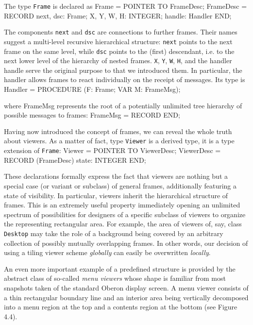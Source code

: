 The type {\tt Frame\/} is declared as
\begintt
Frame = POINTER TO FrameDesc;
FrameDesc = RECORD
  next, dsc: Frame;
  X, Y, W, H: INTEGER;
  handle: Handler
END;
\endtt

\noindent The components {\tt next\/} and {\tt dsc\/} are connections to further frames. Their
names suggest a multi-level recursive hierarchical structure: {\tt next\/}
points to the next frame on the same level, while {\tt dsc\/} points to the
(first) descendant, i.e. to the next lower level of the hierarchy of
nested frames. {\tt X\/}, {\tt Y\/}, {\tt W\/}, {\tt H\/}, and the handler handle serve the original
purpose to that we introduced them. In particular, the handler allows
frames to react individually on the receipt of messages. Its type is
\begintt
Handler = PROCEDURE (F: Frame; VAR M: FrameMsg);
\endtt

\noindent where FrameMsg represents the root of a potentially unlimited tree hierarchy of possible messages to frames:
\begintt
FrameMsg = RECORD END;
\endtt

\noindent Having now introduced the concept of frames, we can reveal the whole truth about viewers. As a matter of fact, type {\tt Viewer\/} is a derived type, it is a type extension of {\tt Frame\/}:
\begintt
Viewer = POINTER TO ViewerDesc;
ViewerDesc = RECORD (FrameDesc)
  state: INTEGER
END;
\endtt

\noindent These declarations formally express the fact that viewers
are nothing but a special case (or variant or subclass) of general
frames, additionally featuring a state of visibility. In particular,
viewers inherit the hierarchical structure of frames. This is an
extremely useful property immediately opening an unlimited spectrum of
possibilities for designers of a specific subclass of viewers to
organize the representing rectangular area. For example, the area of
viewers of, say, class {\tt Desktop\/} may take the role of a background being
covered by an arbitrary collection of possibly mutually overlapping
frames. In other words, our decision of using a tiling viewer scheme
{\it globally\/} can easily be overwritten {\it locally\/}.

An even more important example of a predefined structure is provided
by the abstract class of so-called {\it menu viewers\/} whose shape is
familiar from most snapshots taken of the standard Oberon display
screen. A menu viewer consists of a thin rectangular boundary line and
an interior area being vertically decomposed into a menu region at the
top and a contents region at the bottom (see Figure 4.4).

